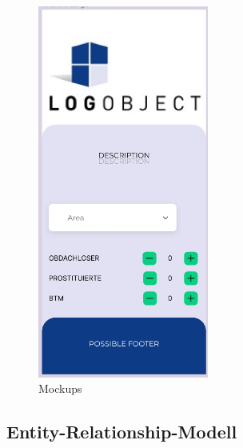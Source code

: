 \documentclass[a4paper,12pt]{article}
\begin{document}
\begin{figure}[h]
\centering
\includegraphics[width=0.5\textwidth]{bilder/prototyp1.png}
\caption{Mockups}
\end{figure}

\clearpage
\subsection{Entity-Relationship-Modell}
\label{sec:entity-relationship-modell}
\end{document}
